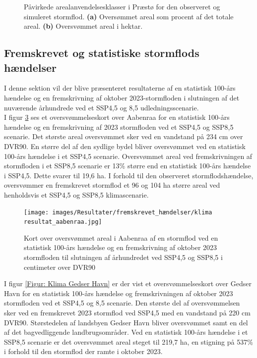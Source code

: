 \begin{figure}[H]
\begin{subfigure}[b]{0.5\textwidth}
        \caption{}
        \label{Subfig: Hektar præstø}
    \end{subfigure}
    \caption{Påvirkede arealanvendelsesklasser i Præstø for den observeret og simuleret stormflod. \textbf{(a)} Oversømmet areal som procent af det totale areal. \textbf{(b)} Oversvømmet areal i hektar.}
    \label{Figur: Påvirket arealanvendelse Præstø}
\end{figure}



\subsection{Fremskrevet og statistiske stormflods hændelser}

I denne sektion vil der blive præsenteret resultaterne  af en statistisk 100-års hændelse og en fremskrivning af oktober 2023-stormfloden i slutningen af det nuværende århundrede ved et SSP4,5 og 8,5 udledningsscenarie. \\

I figur \ref{Figur: Klima Aabenraa} ses et oversvømmelseskort over Aabenraa for en statistisk 100-års hændelse og en fremskrivning af 2023 stormfloden ved et SSP4,5 og SSP8,5 scenarie. Det største areal oversvømmet sker ved en vandstand på 234 cm over DVR90. En større del af den sydlige bydel bliver oversvømmet ved en statistisk 100-års hændelse i et SSP4,5 scenarie. Oversvømmet areal ved fremskrivningen af stormfloden i et SSP8,5 scenarie er 13\% større end en statistisk 100-års hændelse i SSP4,5. Dette svarer til 19,6 ha. I forhold til den observeret stormflodshændelse, oversvømmer en fremskrevet stormflod et 96 og 104 ha større areal ved henholdsvis et SSP4,5 og SSP8,5 klimascenarie.
\begin{figure}[H]
    \centering
    \texttt{[image: images/Resultater/fremskrevet\_hændelser/klima resultat\_aabenraa.jpg]}
    \caption{Kort over oversvømmet areal i Aabenraa af en stormflod ved en statistisk 100-års hændelse og en fremskrivning af oktober 2023 stormfloden til slutningen af århundredet ved SSP4,5 og SSP8,5 i centimeter over DVR90}
    \label{Figur: Klima Aabenraa}
\end{figure}

I figur \ref{Figur: Klima Gedser Havn} er der vist et oversvømmelseskort over Gedser Havn for en statistisk 100-års hændelse og fremskrivningen af oktober 2023 stormfloden ved et SSP4,5 og 8,5 scenarie. Den største del af oversvømmelsen sker ved en fremskrevet 2023 stormflod ved SSP4,5 med en vandstand på 220 cm DVR90. Størstedelen af landsbyen Gedser Havn bliver oversvømmet samt en del af det bagvedliggende landbrugsområder. Ved en statistisk 100-års hændelse i et SSP8,5 scenarie er det oversvømmet areal steget til 219,7 ha, en stigning på 537\% i forhold til den stormflod der ramte i oktober 2023. 

